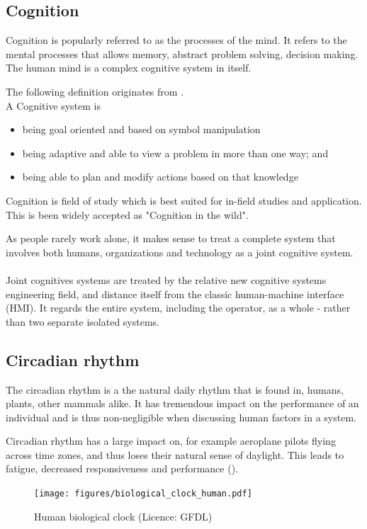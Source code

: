 \subsection{Cognition}
Cognition is popularly referred to as the processes of the mind. It refers to the mental processes that allows memory, abstract problem solving, decision making. The human mind is a complex cognitive system in itself.

The following definition originates from \cite{hollnagel2005joint}.\\
A Cognitive system is
\begin{itemize}
  \item being goal oriented and based on symbol manipulation
  \item being adaptive and able to view a problem in more than one way; and
  \item being able to plan and modify actions based on that knowledge
\end{itemize}
Cognition is field of study which is best suited for in-field studies and application. This is been widely accepted as "Cognition in the wild".

As people rarely work alone, it makes sense to treat a complete system that involves both humans, organizations and technology as a joint cognitive system. \cite{hollnagel2005joint}\\
\\
Joint cognitives systems are treated by the relative new cognitive systems engineering field, and distance itself from the classic human-machine interface (HMI). It regards the entire system, including the operator, as a whole - rather than two separate isolated systems.
\subsection{Circadian rhythm}
The circadian rhythm is a the natural daily rhythm that is found in, humans, plants, other mammals alike. It has tremendous impact on the performance of an individual and is thus non-negligible when discussing human factors in a system.

Circadian rhythm has a large impact on, for example aeroplane pilots flying across time zones, and thus loses their natural sense of daylight. This leads to fatigue, decreased responsiveness and performance (\cite{mallis2010aircrew}).
\begin{figure}[h]
 \centering
   \texttt{[image: figures/biological\_clock\_human.pdf]}
 \caption{Human biological clock (Licence: GFDL)}
 \label{fig:human_biological_clock}
\end{figure}

